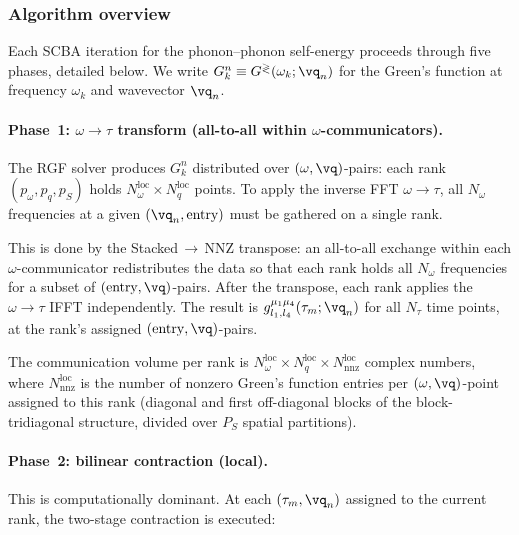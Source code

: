 \subsubsection{Algorithm overview}
\label{sssub:algorithm}

Each SCBA iteration for the phonon--phonon self-energy
proceeds through five phases, detailed below.  We write $G_k^n \equiv
G^{\gtrless}(\omega_k;\vq_n)$ for the Green's function at
frequency $\omega_k$ and wavevector $\vq_n$.

\paragraph{Phase~1: $\omega\to\tau$ transform
  (all-to-all within $\omega$-communicators).}
%
The RGF solver produces $G_k^n$ distributed over
$(\omega,\vq)$-pairs: each rank $(p_\omega,p_q,p_S)$ holds
$N_\omega^{\mathrm{loc}} \times N_q^{\mathrm{loc}}$ points.
To apply the inverse FFT $\omega\to\tau$, all $N_\omega$
frequencies at a given $(\vq_n, \text{entry})$ must be
gathered on a single rank.

This is done by the Stacked$\,\to\,$NNZ transpose:
an all-to-all exchange within each $\omega$-communicator
redistributes the data so that each rank holds all $N_\omega$
frequencies for a subset of $(\text{entry},\vq)$-pairs.
After the transpose, each rank applies the $\omega\to\tau$
IFFT independently.  The result is
$g^{\mu_1\mu_4}_{l_1,l_4}(\tau_m;\vq_n)$ for all $N_\tau$
time points, at the rank's assigned $(\text{entry},\vq)$-pairs.

The communication volume per rank is
$N_\omega^{\mathrm{loc}}\times N_q^{\mathrm{loc}} \times
  N_{\mathrm{nnz}}^{\mathrm{loc}}$ complex numbers, where
$N_{\mathrm{nnz}}^{\mathrm{loc}}$ is the number of nonzero
Green's function entries per $(\omega,\vq)$-point assigned to
this rank (diagonal and first off-diagonal blocks of the
block-tridiagonal structure, divided over $P_S$ spatial
partitions).

\paragraph{Phase~2: bilinear contraction (local).}
%
This is computationally dominant.
At each $(\tau_m, \vq_n)$ assigned to the current rank, the
two-stage contraction is executed:

